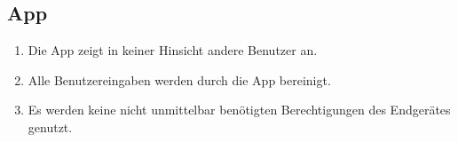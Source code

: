 \subsection{App}

\begin{enumerate}
    \item Die App zeigt in keiner Hinsicht andere Benutzer an.
    \item Alle Benutzereingaben werden durch die App bereinigt.
    \item Es werden keine nicht unmittelbar benötigten Berechtigungen des Endgerätes genutzt.
\end{enumerate}